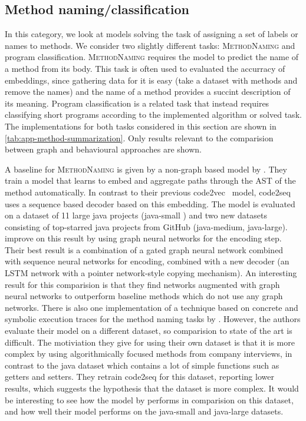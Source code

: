 \documentclass[sigconf,authordraft=true,nonacm=true]{acmart}
\begin{document}
\subsection{Method naming/classification}
In this category, we look at models solving the task of assigning a set of labels or names to methods.
We consider two slightly different tasks: \textsc{MethodNaming} and program classification.
\textsc{MethodNaming} requires the model to predict the name of a method from its body.
This task is often used to evaluated the accurracy of embeddings, since gathering data for it is easy (take a dataset with methods and remove the names) and the name of a method provides a succint description of its meaning.
Program classification is a related task that instead requires classifying short programs according to the implemented algorithm or solved task.
The implementations for both tasks considered in this section are shown in \cref{tab:app-method-summarization}.
Only results relevant to the comparision between graph and behavioural approaches are shown.

A baseline for \textsc{MethodNaming} is given by a non-graph based model by \citet{alon_code2seq_2019}.
They train a model that learns to embed and aggregate paths through the AST of the method automatically.
In contrast to their previous code2vec~\cite{alon_code2vec_2019} model, code2seq uses a sequence based decoder based on this embedding.
The model is evaluated on a dataset of 11 large java projects (java-small \cite{allamanis_convolutional_2016}) and two new datasets consisting of top-starred java projects from GitHub (java-medium, java-large).
\citet{fernandes_structured_2020} improve on this result by using graph neural networks for the encoding step.
Their best result is a combination of a gated graph neural network combined with sequence neural networks for encoding, combined with a new decoder (an LSTM network with a pointer network-style copying mechanism).
An interesting result for this comparision is that they find networks augmented with graph neural networks to outperform baseline methods which do not use any graph networks.
There is also one implementation of a technique based on concrete and symbolic execution traces for the method naming tasks by \citet{wang_learning_2019-1}.
However, the authors evaluate their model on a different dataset, so comparision to state of the art is difficult.
The motiviation they give for using their own dataset is that it is more complex by using algorithmically focused methods from company interviews, in contrast to the java dataset which contains a lot of simple functions such as getters and setters.
They retrain code2seq for this dataset, reporting lower results, which suggests the hypothesis that the dataset is more complex.
It would be interesting to see how the model by \citet{fernandes_structured_2020} performs in comparision on this dataset, and how well their model performs on the java-small and java-large datasets.
\end{document}

